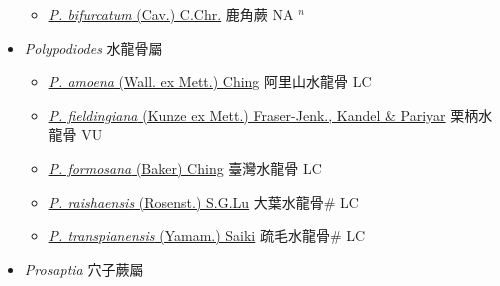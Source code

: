 \begin{itemize}
  \begin{itemize}
        \item[] \href{http://www.theplantlist.org/tpl1.1/search?q=Platycerium+bifurcatum}{\textit{P. bifurcatum} (Cav.) C.Chr.}   鹿角蕨 NA $^n$
  \end{itemize}
 \item[] \textit{Polypodiodes} 水龍骨屬
                    
  \begin{itemize}
        \item[] \href{http://www.theplantlist.org/tpl1.1/search?q=Polypodiodes+amoena}{\textit{P. amoena} (Wall. ex Mett.) Ching}     阿里山水龍骨 LC
        \item[] \href{http://www.theplantlist.org/tpl1.1/search?q=Polypodiodes+fieldingiana}{\textit{P. fieldingiana} (Kunze ex Mett.) Fraser-Jenk., Kandel \& Pariyar}     栗柄水龍骨 VU
        \item[] \href{http://www.theplantlist.org/tpl1.1/search?q=Polypodiodes+formosana}{\textit{P. formosana} (Baker) Ching}     臺灣水龍骨 LC
        \item[] \href{http://www.theplantlist.org/tpl1.1/search?q=Polypodiodes+raishaensis}{\textit{P. raishaensis} (Rosenst.) S.G.Lu}     大葉水龍骨\# LC
        \item[] \href{http://www.theplantlist.org/tpl1.1/search?q=Polypodiodes+transpianensis}{\textit{P. transpianensis} (Yamam.) Saiki}     疏毛水龍骨\# LC
  \end{itemize}
 \item[] \textit{Prosaptia} 穴子蕨屬
                    

\end{itemize}

